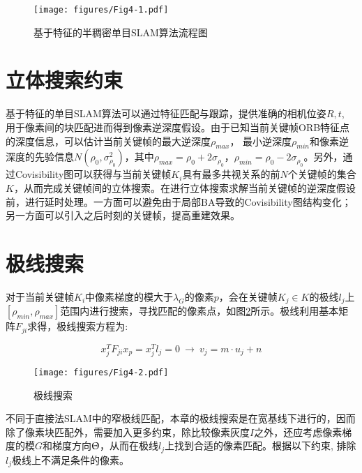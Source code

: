 \begin{figure}[h]
\centering
\texttt{[image: figures/Fig4-1.pdf]}
\caption{基于特征的半稠密单目SLAM算法流程图}
\label{fig4.1}
\end{figure}





\section{立体搜索约束}
基于特征的单目SLAM算法可以通过特征匹配与跟踪，提供准确的相机位姿$R,t$, 用于像素间的块匹配进而得到像素逆深度假设。由于已知当前关键帧ORB特征点的深度信息，可以估计当前关键帧的最大逆深度$\rho_{max}$， 最小逆深度$\rho_{min}$和像素逆深度的先验信息$N\left( \rho_0,\sigma_{\rho_0}^2  \right)$，其中$\rho_{max}=\rho_0+2\sigma_{\rho_0}$，$\rho_{min}=\rho_0-2\sigma_{\rho_0}$。另外，通过Covisibility图可以获得与当前关键帧$K_i$具有最多共视关系的前$N$个关键帧的集合$K$，从而完成关键帧间的立体搜索。在进行立体搜索求解当前关键帧的逆深度假设前，进行延时处理。一方面可以避免由于局部BA导致的Covisibility图结构变化；另一方面可以引入之后时刻的关键帧，提高重建效果。


\section{极线搜索}
对于当前关键帧$K_i$中像素梯度的模大于$\lambda_G$的像素$p$，会在关键帧$K_j \in K$的极线$l_j$上$\left[ \rho_{min}, \rho_{max} \right]$范围内进行搜索，寻找匹配的像素点，如图\ref{fig4.2}所示。极线利用基本矩阵$F_{ji}$求得，极线搜索方程为:

\begin{equation}
\label{equ4.1}
x_j^T F_{ji}x_p = x^T_jl_j=0 \  \rightarrow \  v_j = m \cdot u_j+n
\end{equation}


\begin{figure}
\centering
\texttt{[image: figures/Fig4-2.pdf]}
\caption{极线搜索}
\label{fig4.2}
\end{figure}



不同于直接法SLAM中的窄极线匹配，本章的极线搜索是在宽基线下进行的，因而除了像素块匹配外，需要加入更多约束，除比较像素灰度$I$之外，还应考虑像素梯度的模$G$和梯度方向$\Uptheta$，从而在极线$l_j$上找到合适的像素匹配。根据以下约束\upcite{[4.2]}, 排除$l_j$极线上不满足条件的像素。


